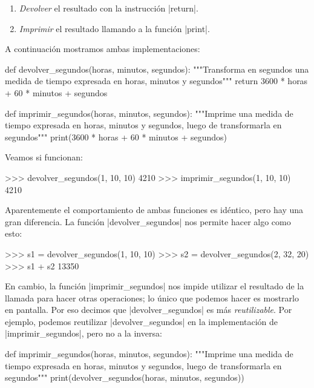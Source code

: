 \begin{enumerate}
\item {\it Devolver} el resultado con la instrucción |return|.
\item {\it Imprimir} el resultado llamando a la función |print|.
\end{enumerate}

A continuación mostramos ambas implementaciones:

\begin{codigo-python-sn}
def devolver_segundos(horas, minutos, segundos):
    """Transforma en segundos una medida de tiempo expresada en
       horas, minutos y segundos"""
    return 3600 * horas + 60 * minutos + segundos

def imprimir_segundos(horas, minutos, segundos):
    """Imprime una medida de tiempo expresada en horas, minutos y
       segundos, luego de transformarla en segundos"""
    print(3600 * horas + 60 * minutos + segundos)
\end{codigo-python-sn}

Veamos si funcionan:

\begin{codigo-python-sn}
>>> devolver_segundos(1, 10, 10)
4210
>>> imprimir_segundos(1, 10, 10)
4210
\end{codigo-python-sn}

Aparentemente el comportamiento de ambas funciones es idéntico, pero hay una
gran diferencia. La función |devolver_segundos| nos permite hacer algo como
esto:

\begin{codigo-python-sn}
>>> s1 = devolver_segundos(1, 10, 10)
>>> s2 = devolver_segundos(2, 32, 20)
>>> s1 + s2
13350
\end{codigo-python-sn}

En cambio, la función |imprimir_segundos| nos impide utilizar el resultado de
la llamada para hacer otras operaciones; lo único que podemos hacer es
mostrarlo en pantalla. Por eso decimos que |devolver_segundos| es más {\it
reutilizable}. Por ejemplo, podemos reutilizar |devolver_segundos| en la
implementación de |imprimir_segundos|, pero no a la inversa:

\begin{codigo-python-sn}
def imprimir_segundos(horas, minutos, segundos):
    """Imprime una medida de tiempo expresada en horas, minutos y
       segundos, luego de transformarla en segundos"""
    print(devolver_segundos(horas, minutos, segundos))
\end{codigo-python-sn}

